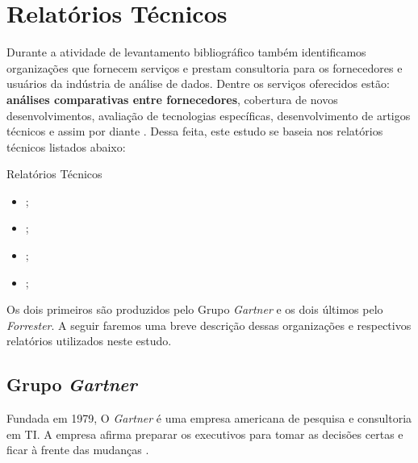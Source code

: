 \section{Relatórios Técnicos}
\label{sec-relatorios}

Durante a atividade de levantamento bibliográfico também identificamos organizações que fornecem serviços e prestam consultoria para os fornecedores e usuários da indústria de análise de dados. Dentre os serviços oferecidos estão: \textbf{análises comparativas entre fornecedores}, cobertura de novos desenvolvimentos, avaliação de tecnologias específicas, desenvolvimento de artigos técnicos e assim por diante \cite{turban2019}. Dessa feita, este estudo se baseia nos relatórios técnicos listados abaixo:

\begin{env-destaque}{Relatórios Técnicos}
\begin{itemize}
    \item \RelatorioGMQ \xspace \cite{gartner:magicquadrant};
    
    \item \RelatorioGCC \xspace \cite{gartner:criticalcapabilities};
    
    \item \RelatorioFCM \xspace \cite{forrester:clientmanaged};
    
    \item \RelatorioFVM \xspace \cite{forrester:vendormanaged};
\end{itemize}
\end{env-destaque}


Os dois primeiros são produzidos pelo Grupo \emph{Gartner} e os dois últimos pelo \emph{Forrester}. A seguir faremos uma breve descrição dessas organizações e respectivos relatórios utilizados neste estudo.


\subsection{Grupo \emph{Gartner}}

Fundada em 1979, O \emph{Gartner} é uma empresa americana de pesquisa e consultoria em TI. A empresa afirma preparar os executivos para tomar as decisões certas e ficar à frente das mudanças \cite{gartner:about}. 

